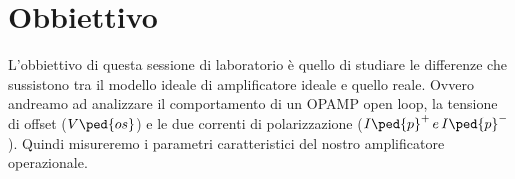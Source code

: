 \section*{Obbiettivo}

L'obbiettivo di questa sessione di laboratorio è quello di studiare le differenze che sussistono tra il modello ideale di amplificatore ideale e quello reale.
Ovvero andreamo ad analizzare il comportamento di un OPAMP open loop, la tensione di offset ($V\ped{os}$) e le due correnti di polarizzazione ($I\ped{p}^+\,e\,I\ped{p}^-$). Quindi misureremo i parametri caratteristici del nostro amplificatore operazionale.
